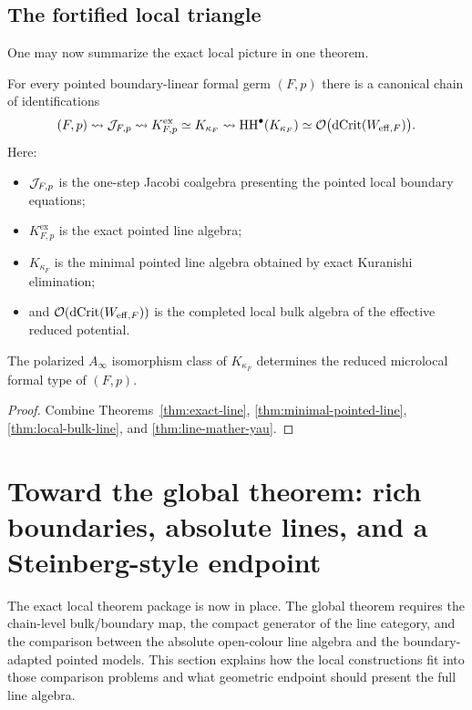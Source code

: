\subsection{The fortified local triangle}

One may now summarize the exact local picture in one theorem.

\begin{theorem}%
For every pointed boundary-linear formal germ $(F,p)$ there is a canonical chain of identifications
\[
(F,p)
\rightsquigarrow
\mathcal J_{F,p}
\rightsquigarrow
K^{\mathrm{ex}}_{F,p}
\simeq
K_{\kappa_F}
\rightsquigarrow
\operatorname{HH}^\bullet(K_{\kappa_F})
\simeq
\mathcal O\bigl(\operatorname{dCrit}(W_{\mathrm{eff},F})\bigr).
\]
Here:
\begin{itemize}[leftmargin=1.8em]
\item $\mathcal J_{F,p}$ is the one-step Jacobi coalgebra presenting the pointed local boundary equations;
\item $K^{\mathrm{ex}}_{F,p}$ is the exact pointed line algebra;
\item $K_{\kappa_F}$ is the minimal pointed line algebra obtained by exact Kuranishi elimination;
\item and $\mathcal O(\operatorname{dCrit}(W_{\mathrm{eff},F}))$ is the completed local bulk algebra of the effective reduced potential.
\end{itemize}
The polarized $A_\infty$ isomorphism class of $K_{\kappa_F}$ determines the reduced microlocal formal type of $(F,p)$.
\end{theorem}

\begin{proof}
Combine Theorems~\ref{thm:exact-line}, \ref{thm:minimal-pointed-line}, \ref{thm:local-bulk-line}, and \ref{thm:line-mather-yau}.
\end{proof}


\section{Toward the global theorem: rich boundaries, absolute lines, and a Steinberg-style endpoint}%

The exact local theorem package is now in place. The global theorem
requires the chain-level bulk/boundary map, the compact generator of
the line category, and the comparison between the absolute open-colour
line algebra and the boundary-adapted pointed models. This section
explains how the local constructions fit into those comparison
problems and what geometric endpoint should present the full line
algebra.

